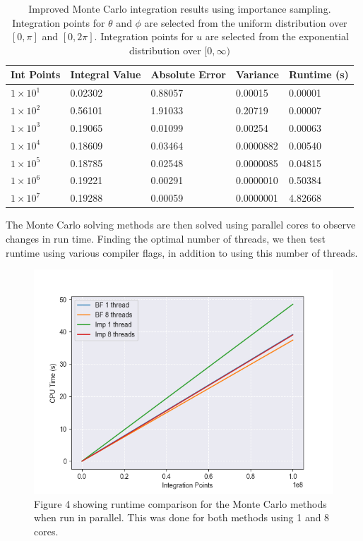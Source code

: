 \documentclass{emulateapj}
\begin{document}
\begin{table}[H]
\caption{Improved Monte Carlo integration results using importance sampling. Integration points for $\theta$ and $\phi$ are selected from the uniform distribution over $[0,\pi]$ and $[0,2\pi]$. Integration points for $u$ are selected from the exponential distribution over $[0,\infty)$}
\label{tab:table2}
\begin{ruledtabular}
\begin{tabular}{p{1.3cm} p{1.5cm} p{1.5cm}p{1.5cm} p{1.5cm} }
Int Points & Integral Value & Absolute Error & Variance & Runtime (s)\\
\hline
 $1\times10^{1}$ & 0.02302 & 0.88057 & 0.00015   & 0.00001\\
 $1\times10^{2}$ & 0.56101 & 1.91033 & 0.20719   & 0.00007\\
 $1\times10^{3}$ & 0.19065 & 0.01099 & 0.00254   & 0.00063\\
 $1\times10^{4}$ & 0.18609 & 0.03464 & 0.0000882 & 0.00540\\
 $1\times10^{5}$ & 0.18785 & 0.02548 & 0.0000085 & 0.04815\\
 $1\times10^{6}$ & 0.19221 & 0.00291 & 0.0000010 & 0.50384\\
 $1\times10^{7}$ & 0.19288 & 0.00059 & 0.0000001 & 4.82668\\
\end{tabular}
\end{ruledtabular}
\end{table}

The Monte Carlo solving methods are then solved using parallel cores to observe changes in run time. Finding the optimal number of threads, we then test runtime using various compiler flags, in addition to using this number of threads.
\begin{figure}[H]
    \centering
    \includegraphics[scale=0.5]{Parallel.png}
    \caption{Figure 4 showing runtime comparison for the Monte Carlo methods when run in parallel. This was done for both methods using 1 and 8 cores.}
    \label{fig:fig4}
\end{figure}
\end{document}
